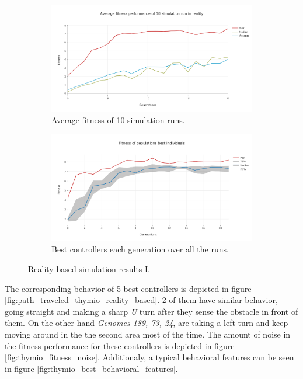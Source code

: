 \begin{figure}[H]
    \centering
    \begin{subfigure}[b]{0.8\textwidth}
    	\centering
        \includegraphics[width=14cm]{include/images/real_avg_fitness.PNG}
        \caption{Average fitness of 10 simulation runs.}
        \label{fig:real_avg_fitness}
    \end{subfigure}
    \begin{subfigure}[b]{0.8\textwidth}
    	\centering
        \includegraphics[width=14cm]{include/images/real_best_genomes_percentile.PNG}
        \caption{Best controllers each generation over all the runs.}
        \label{fig:real_best_genomes_percentile}
    \end{subfigure}
    \caption{Reality-based simulation results I.}
	\label{fig:real_based_resultsI}
\end{figure}

The corresponding behavior of 5 best controllers is depicted in figure \ref{fig:path_traveled_thymio_reality_based}. 2 of them have similar behavior, going straight and making a sharp \emph{U} turn after they sense the obstacle in front of them. On the other hand \emph{Genomes 189, 73, 24}, are taking a left turn and keep moving around in the the second area most of the time. The amount of noise in the fitness performance for these controllers is depicted in figure \ref{fig:thymio_fitness_noise}. Additionaly, a typical behavioral features can be seen in figure \ref{fig:thymio_best_behavioral_features}.

